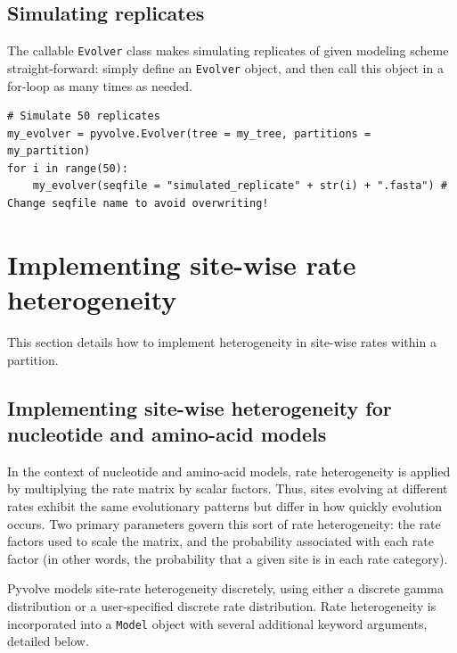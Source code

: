 \documentclass{article}
\newcommand{\code}[1]{\texttt{\small{#1}}}
\begin{document}
\subsection{Simulating replicates}

The callable \code{Evolver} class makes simulating replicates of given modeling scheme straight-forward: simply define an \code{Evolver} object, and then call this object in a for-loop as many times as needed.

\begin{lstlisting}
# Simulate 50 replicates
my_evolver = pyvolve.Evolver(tree = my_tree, partitions = my_partition)
for i in range(50):
	my_evolver(seqfile = "simulated_replicate" + str(i) + ".fasta") # Change seqfile name to avoid overwriting!
\end{lstlisting}


















\section{Implementing site-wise rate heterogeneity}\label{sec:sitehet}

This section details how to implement heterogeneity in site-wise rates within a partition.


\subsection{Implementing site-wise heterogeneity for nucleotide and amino-acid models}

In the context of nucleotide and amino-acid models, rate heterogeneity is applied by multiplying the rate matrix by scalar factors. Thus, sites evolving at different rates exhibit the same evolutionary patterns but differ in how quickly evolution occurs. Two primary parameters govern this sort of rate heterogeneity: the rate factors used to scale the matrix, and the probability associated with each rate factor (in other words, the probability that a given site is in each rate category).  

Pyvolve models site-rate heterogeneity discretely, using either a discrete gamma distribution or a user-specified discrete rate distribution. Rate heterogeneity is incorporated into a \code{Model} object with several additional keyword arguments, detailed below. 
\end{document}
